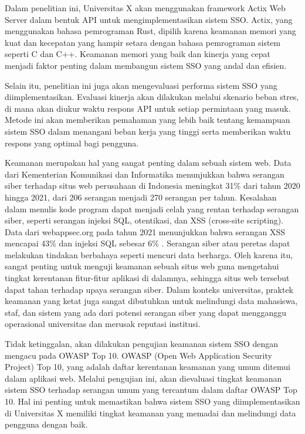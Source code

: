 \documentclass{article}
\begin{document}
Dalam penelitian ini, Universitas X akan menggunakan framework Actix Web Server dalam bentuk API untuk mengimplementasikan sistem SSO. Actix, yang menggunakan bahasa pemrograman Rust, dipilih karena keamanan memori yang kuat dan kecepatan yang hampir setara dengan bahasa pemrograman sistem seperti C dan C++. Keamanan memori yang baik dan kinerja yang cepat menjadi faktor penting dalam membangun sistem SSO yang andal dan efisien\cite{kyriakou2022complementing}.

Selain itu, penelitian ini juga akan mengevaluasi performa sistem SSO yang diimplementasikan. Evaluasi kinerja akan dilakukan melalui skenario beban stres, di mana akan diukur waktu respons API untuk setiap permintaan yang masuk. Metode ini akan memberikan pemahaman yang lebih baik tentang kemampuan sistem SSO dalam menangani beban kerja yang tinggi serta memberikan waktu respons yang optimal bagi pengguna.

Keamanan merupakan hal yang sangat penting dalam sebuah sistem web. Data dari Kementerian Komunikasi dan Informatika menunjukkan bahwa serangan siber terhadap situs web perusahaan di Indonesia meningkat 31\% dari tahun 2020 hingga 2021, dari 206 serangan menjadi 270 serangan per tahun. Kesalahan dalam menulis kode program dapat menjadi celah yang rentan terhadap serangan siber, seperti serangan injeksi SQL, otentikasi, dan XSS (cross-site scripting). Data dari webappsec.org pada tahun 2021 menunjukkan bahwa serangan XSS mencapai 43\% dan injeksi SQL sebesar 6\% . Serangan siber atau peretas dapat melakukan tindakan berbahaya seperti mencuri data berharga. Oleh karena itu, sangat penting untuk menguji keamanan sebuah situs web guna mengetahui tingkat kerentanan fitur-fitur aplikasi di dalamnya, sehingga situs web tersebut dapat tahan terhadap upaya serangan siber. Dalam konteks universitas, praktek keamanan yang ketat juga sangat dibutuhkan untuk melindungi data mahasiswa, staf, dan sistem yang ada dari potensi serangan siber yang dapat mengganggu operasional universitas dan merusak reputasi institusi\cite{Priyawati2022WebsiteVT}.

Tidak ketinggalan, akan dilakukan pengujian keamanan sistem SSO dengan mengacu pada OWASP Top 10. OWASP (Open Web Application Security Project) Top 10, yang adalah daftar kerentanan keamanan yang umum ditemui dalam aplikasi web. Melalui pengujian ini, akan dievaluasi tingkat keamanan sistem SSO terhadap serangan umum yang tercantum dalam daftar OWASP Top 10\cite{Priyawati2022WebsiteVT}. Hal ini penting untuk memastikan bahwa sistem SSO yang diimplementasikan di Universitas X memiliki tingkat keamanan yang memadai dan melindungi data pengguna dengan baik.
\end{document}
